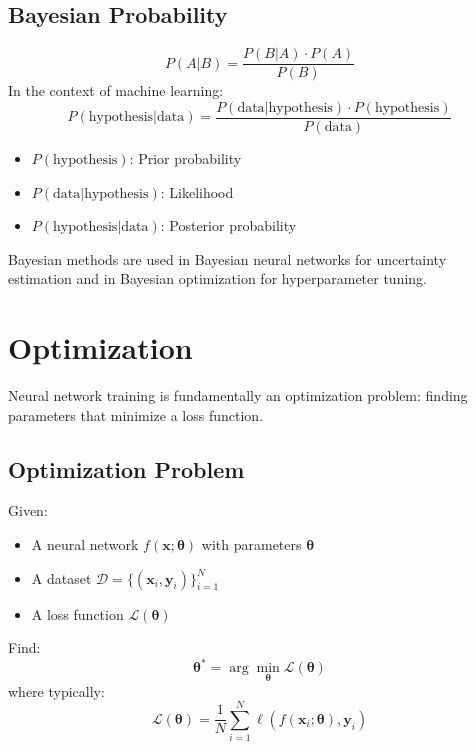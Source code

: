 \subsection{Bayesian Probability}

\begin{definition}
\begin{equation}
P(A|B) = \frac{P(B|A) \cdot P(A)}{P(B)}
\end{equation}
In the context of machine learning:
\begin{equation}
P(\text{hypothesis}|\text{data}) = \frac{P(\text{data}|\text{hypothesis}) \cdot P(\text{hypothesis})}{P(\text{data})}
\end{equation}
\begin{itemize}
    \item $P(\text{hypothesis})$: Prior probability
    \item $P(\text{data}|\text{hypothesis})$: Likelihood
    \item $P(\text{hypothesis}|\text{data})$: Posterior probability
\end{itemize}
\end{definition}

Bayesian methods are used in Bayesian neural networks for uncertainty estimation and in Bayesian optimization for hyperparameter tuning.

\section{Optimization}

Neural network training is fundamentally an optimization problem: finding parameters that minimize a loss function.

\subsection{Optimization Problem}

\begin{problem}
Given:
\begin{itemize}
    \item A neural network $f(\mathbf{x}; \mathbf{\theta})$ with parameters $\mathbf{\theta}$
    \item A dataset $\mathcal{D} = \{(\mathbf{x}_i, \mathbf{y}_i)\}_{i=1}^{N}$
    \item A loss function $\mathcal{L}(\mathbf{\theta})$
\end{itemize}
Find:
\begin{equation}
\mathbf{\theta}^* = \arg\min_{\mathbf{\theta}} \mathcal{L}(\mathbf{\theta})
\end{equation}
where typically:
\begin{equation}
\mathcal{L}(\mathbf{\theta}) = \frac{1}{N}\sum_{i=1}^{N} \ell(f(\mathbf{x}_i; \mathbf{\theta}), \mathbf{y}_i)
\end{equation}
\end{problem}

